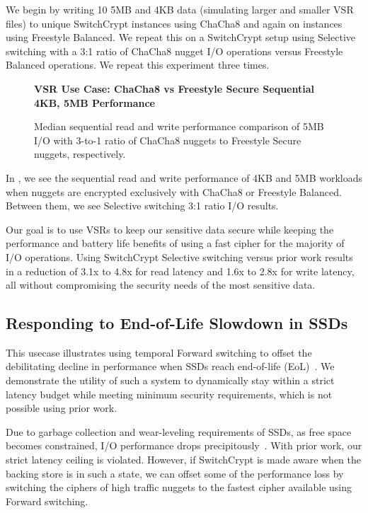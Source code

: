 We begin by writing 10 5MB and 4KB data (simulating larger and smaller VSR
files) to unique SwitchCrypt instances using ChaCha8 and again on instances
using Freestyle Balanced. We repeat this on a SwitchCrypt setup using Selective
switching with a 3:1 ratio of ChaCha8 nugget I/O operations versus Freestyle
Balanced operations. We repeat this experiment three times.

\begin{figure}[ht] \textbf{VSR Use Case: ChaCha8 vs Freestyle Secure Sequential
4KB, 5MB Performance}\par\medskip
   \centering
   {} \caption{Median sequential read and
   write performance comparison of 5MB I/O with 3-to-1 ratio of ChaCha8 nuggets
   to Freestyle Secure nuggets, respectively.}
  \label{fig:usecase-vsr-bar}
\end{figure}

In , we see the sequential read and write performance of
4KB and 5MB workloads when nuggets are encrypted exclusively with ChaCha8 or
Freestyle Balanced. Between them, we see Selective switching 3:1 ratio I/O
results.

Our goal is to use VSRs to keep our sensitive data secure while keeping the
performance and battery life benefits of using a fast cipher for the majority of
I/O operations. Using SwitchCrypt Selective switching versus prior work results
in a reduction of 3.1x to 4.8x for read latency and 1.6x to 2.8x for write
latency, all without compromising the security needs of the most sensitive data.

\subsection{Responding to End-of-Life Slowdown in SSDs} \label{subsec:uc3}

This usecase illustrates using temporal Forward switching to offset the
debilitating decline in performance when SSDs reach end-of-life
(EoL)~\cite{SSDEOL1}. We demonstrate the utility of such a system to dynamically
stay within a strict latency budget while meeting minimum security requirements,
which is not possible using prior work.

Due to garbage collection and wear-leveling requirements of SSDs, as free space
becomes constrained, I/O performance drops precipitously~\cite{SSDEOL1}. With
prior work, our strict latency ceiling is violated. However, if SwitchCrypt is
made aware when the backing store is in such a state, we can offset some of the
performance loss by switching the ciphers of high traffic nuggets to the fastest
cipher available using Forward switching.


